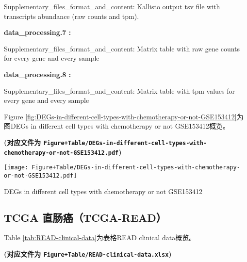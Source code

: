\documentclass[
]{article}
\begin{document}
\begin{center}
\begin{tcolorbox}[colback=gray!10, colframe=gray!50, width=0.9\linewidth, arc=1mm, boxrule=0.5pt]
\vspace{0.5em}

    Supplementary\_files\_format\_and\_content: Kallisto output
tsv file with transcripts abundance (raw counts and tpm).

\vspace{2em}


\textbf{
data\_processing.7
:}

\vspace{0.5em}

    Supplementary\_files\_format\_and\_content: Matrix table
with raw gene counts for every gene and every sample

\vspace{2em}


\textbf{
data\_processing.8
:}

\vspace{0.5em}

    Supplementary\_files\_format\_and\_content: Matrix table
with tpm values for every gene and every sample

\vspace{2em}
\end{tcolorbox}
\end{center}

Figure \ref{fig:DEGs-in-different-cell-types-with-chemotherapy-or-not-GSE153412}为图DEGs in different cell types with chemotherapy or not GSE153412概览。

\textbf{(对应文件为 \texttt{Figure+Table/DEGs-in-different-cell-types-with-chemotherapy-or-not-GSE153412.pdf})}

\def\@captype{figure}
\begin{center}
\texttt{[image: Figure+Table/DEGs-in-different-cell-types-with-chemotherapy-or-not-GSE153412.pdf]}
\caption{DEGs in different cell types with chemotherapy or not GSE153412}\label{fig:DEGs-in-different-cell-types-with-chemotherapy-or-not-GSE153412}
\end{center}

\hypertarget{tcga-ux76f4ux80a0ux764ctcga-read}{%
\subsection{TCGA 直肠癌（TCGA-READ）}\label{tcga-ux76f4ux80a0ux764ctcga-read}}

Table \ref{tab:READ-clinical-data}为表格READ clinical data概览。

\textbf{(对应文件为 \texttt{Figure+Table/READ-clinical-data.xlsx})}
\end{document}
